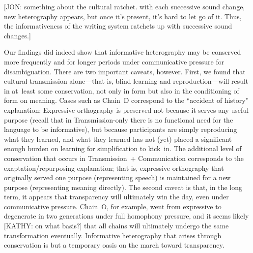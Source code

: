 \documentclass[doc,biblatex]{apa7}
\begin{document}
[JON: something about the cultural ratchet. with each successive sound change, new heterography appears, but once it's present, it's hard to let go of it. Thus, the informativeness of the writing system ratchets up with successive sound changes.]

Our findings did indeed show that informative heterography may be conserved more frequently and for longer periods under communicative pressure for disambiguation. There are two important caveats, however. First, we found that cultural transmission alone---that is, blind learning and reproduction---will result in at~least some conservation, not only in form but also in the conditioning of form on meaning. Cases such as Chain~D correspond to the ``accident of history'' explanation: Expressive orthography is preserved not because it serves any useful purpose (recall that in Transmission-only there is no functional need for the language to be informative), but because participants are simply reproducing what they learned, and what they learned has not (yet) placed a significant enough burden on learning for simplification to kick~in. The additional level of conservation that occurs in Transmission~+ Communication corresponds to the exaptation/repurposing explanation; that is, expressive orthography that originally served one purpose (representing speech) is maintained for a new purpose (representing meaning directly). The second caveat is that, in the long term, it appears that transparency will ultimately win the day, even under communicative pressure. Chain~O, for example, went from expressive to degenerate in two generations under full homophony pressure, and it seems likely [KATHY: on what basis?] that all chains will ultimately undergo the same transformation eventually. Informative heterography that arises through conservation is but a temporary oasis on the march toward transparency.
\end{document}
